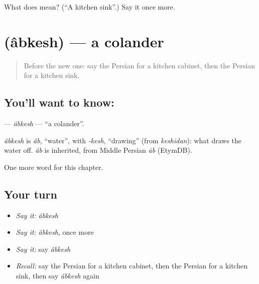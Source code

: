 \begin{tcolorbox}[breakable,colback=teal!4,colframe=teal!35!black,title={Before you move on}]
What does  mean? (\textquotedblleft{}A kitchen sink\textquotedblright{}.) Say it once more.
\end{tcolorbox}
\section[\texorpdfstring{\fa{آبکش} (âbkesh)}{آبکش (âbkesh)}]{ (âbkesh) — a colander}

\label{lesson:FA-C174-abkesh}



\begin{quote}
Before the new one: say the Persian for a kitchen cabinet, then the Persian for a kitchen sink.
\end{quote}

\subsection*{You'll want to know: }
\textbf{} — \emph{âbkesh} — \textquotedblleft{}a colander\textquotedblright{}.

\begin{cousinweb}
\emph{âbkesh} is \emph{âb}, \textquotedblleft{}water\textquotedblright{}, with \emph{-kesh}, \textquotedblleft{}drawing\textquotedblright{} (from \emph{keshidan}): what draws the water off. \emph{âb} is inherited, from Middle Persian \emph{āb} (EtymDB).
\end{cousinweb}

\begin{grammarlens}[title={What you've built}]
One more word for this chapter.
\end{grammarlens}

\subsection*{Your turn}
\begin{itemize}
\raggedright
  \item \emph{Say it:} \emph{âbkesh}
  \item \emph{Say it:} \emph{âbkesh}, once more
  \item \emph{Say it:} say \emph{âbkesh}
  \item \emph{Recall:} say the Persian for a kitchen cabinet, then the Persian for a kitchen sink, then say \emph{âbkesh} again
\end{itemize}

